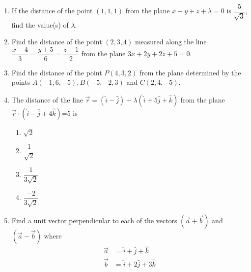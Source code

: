 %
\begin{enumerate}

	\item If the distance of the point $(1,1,1)$ from the plane $x-y+z+\lambda=0$ is $\dfrac{5}{\sqrt{3}}$, find the value(s) of $\lambda$.

	\item Find the distance of the point $(2,3,4)$ measured along the line $\dfrac{x-4}{3}=\dfrac{y+5}{6}=\dfrac{z+1}{2}$ from the plane $3x+2y+2z+5=0$.

	\item Find the distance of the point $P(4,3,2)$ from the plane determined by the points $A(-1,6,-5),B(-5,-2,3)$ and $C(2,4,-5)$.

	\item The distance of the line $\vec{r}=(\hat{i}-\hat{j})+\lambda(\hat{i}+5\hat{j}+\hat{k})$ from the plane $\vec{r}\cdot(\hat{i}-\hat{j}+4\hat{k})$=5 is
		\begin{enumerate}
			\item $\sqrt{2}$
			\item $\dfrac{1}{\sqrt{2}}$
			\item $\dfrac{1}{3\sqrt{2}}$
			\item $\dfrac{-2}{3\sqrt{2}}$
		\end{enumerate}

	\item Find a unit vector perpendicular to each of the vectors $(\vec{a}+\vec{b})$ and $(\vec{a}-\vec{b})$ where 
	\begin{align}
		\vec{a}&=\hat{i}+\hat{j}+\hat{k}\\\vec{b}&=\hat{i}+2\hat{j}+3\hat{k}
	\end{align}
\end{enumerate}
%

